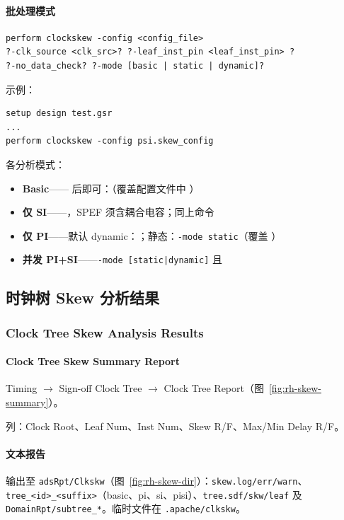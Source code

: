 \paragraph{批处理模式}
\begin{lstlisting}
perform clockskew -config <config_file>
?-clk_source <clk_src>? ?-leaf_inst_pin <leaf_inst_pin> ?
?-no_data_check? ?-mode [basic | static | dynamic]?
\end{lstlisting}

示例：
\begin{lstlisting}
setup design test.gsr
...
perform clockskew -config psi.skew_config
\end{lstlisting}

各分析模式：
\begin{itemize}
  \item \textbf{Basic}—— 后即可：（覆盖配置文件中 ）
  \item \textbf{仅 SI}——，SPEF 须含耦合电容；同上命令
  \item \textbf{仅 PI}——默认 dynamic：；静态：\texttt{-mode static}（覆盖 ）
  \item \textbf{并发 PI+SI}——\texttt{-mode [static|dynamic]} 且 
\end{itemize}

\subsection{时钟树 Skew 分析结果}
\subsubsection*{Clock Tree Skew Analysis Results}

\paragraph{Clock Tree Skew Summary Report}
Timing $\rightarrow$ Sign-off Clock Tree $\rightarrow$ Clock Tree Report（图~\ref{fig:rh-skew-summary}）。

列：Clock Root、Leaf Num、Inst Num、Skew R/F、Max/Min Delay R/F。

\label{fig:rh-skew-summary}

\paragraph{文本报告}
输出至 \texttt{adsRpt/Clkskw}（图~\ref{fig:rh-skew-dir}）：\texttt{skew.log/err/warn}、\texttt{tree\_<id>\_<suffix>}（basic、pi、si、pisi）、\texttt{tree.sdf/skw/leaf} 及 \texttt{DomainRpt/subtree\_*}。临时文件在 \texttt{.apache/clkskw}。

